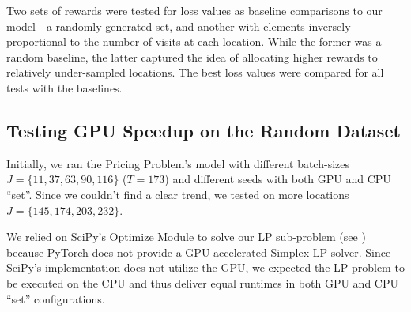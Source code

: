 Two sets of rewards were tested for loss values as baseline comparisons to our model - a randomly generated set, and another with elements inversely proportional to the number of visits at each location. While the former was a random baseline, the latter captured the idea of allocating higher rewards to relatively under-sampled locations. The best loss values were compared for all tests with the baselines.

\subsection{Testing GPU Speedup on the Random Dataset} \label{sec:Pricing Problem-Testing GPU Speedup on the Random Dataset}
Initially, we ran the Pricing Problem's model with different batch-sizes $J = \{11, 37, 63, 90, 116\}$ ($T = 173$) and different seeds with both GPU and CPU ``set''. Since we couldn't find a clear trend, we tested on more locations $J = \{145, 174, 203, 232\}$.

We relied on SciPy's Optimize Module to solve our LP sub-problem (see ) because PyTorch does not provide a GPU-accelerated Simplex LP solver. Since SciPy's implementation does not utilize the GPU, we expected the LP problem to be executed on the CPU and thus deliver equal runtimes in both GPU and CPU ``set'' configurations.
